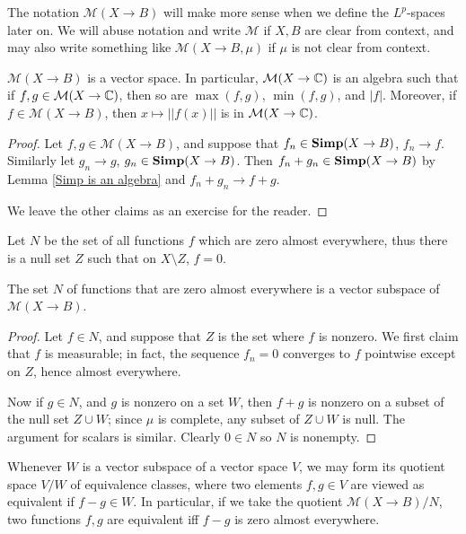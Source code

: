 \begin{subsec}
The notation $\mathcal M(X \to B)$ will make more sense when we define the $L^p$-spaces later on.
We will abuse notation and write $\mathcal M$ if $X,B$ are clear from context, and may also write something like $\mathcal M(X \to B, \mu)$ if $\mu$ is not clear from context.
\end{subsec}

\begin{lemma}
$\mathcal M(X \to B)$ is a vector space.
In particular, $\mathcal M(X \to \mathbb{C})$ is an algebra such that if $f, g \in \mathcal M(X \to \mathbb{C})$, then so are $\max(f,g)$, $\min(f,g)$, and $|f|$.
Moreover, if $f \in \mathcal M(X \to B)$, then $x \mapsto ||f(x)||$ is in $\mathcal M(X \to \mathbb{C})$.
\end{lemma}
\begin{proof}
Let $f,g \in \mathcal M(X \to B)$, and suppose that $f_{n} \in \mathbf{Simp}(X \to B)$, $f_{n} \to f$. Similarly let $g_{n} \to g$, $g_{n} \in \mathbf{Simp}(X \to B)$.
Then $f_{n} + g_{n} \in \mathbf{Simp}(X \to B)$ by Lemma \ref{Simp is an algebra} and $f_{n} + g_{n} \to f + g$.

We leave the other claims as an exercise for the reader.
\end{proof}

\begin{subsec}
Let $N$ be the set of all functions $f$ which are zero almost everywhere, thus there is a null set $Z$ such that on $X \setminus Z$, $f = 0$.
\end{subsec}

\begin{lemma}
The set $N$ of functions that are zero almost everywhere is a vector subspace of $\mathcal M(X \to B)$.
\end{lemma}
\begin{proof}
Let $f \in N$, and suppose that $Z$ is the set where $f$ is nonzero.
We first claim that $f$ is measurable; in fact, the sequence $f_{n} = 0$ converges to $f$ pointwise except on $Z$, hence almost everywhere.

Now if $g \in N$, and $g$ is nonzero on a set $W$, then $f + g$ is nonzero on a subset of the null set $Z \cup W$; since $\mu$ is complete, any subset of $Z \cup W$ is null. The argument for scalars is similar. Clearly $0 \in N$ so $N$ is nonempty.
\end{proof}

\begin{subsec}
Whenever $W$ is a vector subspace of a vector space $V$, we may form its quotient space $V/W$ of equivalence classes, where two elements $f, g \in V$ are viewed as equivalent if $f - g \in W$.
In particular, if we take the quotient $\mathcal M(X \to B)/N$, two functions $f,g$ are equivalent iff $f - g$ is zero almost everywhere.
\end{subsec}


